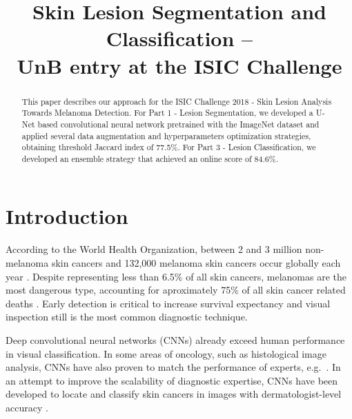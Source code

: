 \documentclass[conference]{IEEEtran}
\begin{document}
\title{Skin Lesion Segmentation and Classification --\\
  UnB entry at the ISIC Challenge}

\author{
}

\maketitle


\begin{abstract}
  This paper describes our approach for the ISIC Challenge 2018 - Skin Lesion Analysis Towards Melanoma Detection. For Part 1 - Lesion Segmentation, we developed a U-Net based convolutional neural network pretrained with the ImageNet dataset and applied several data augmentation and hyperparameters optimization strategies, obtaining threshold Jaccard index of 77.5\%. For Part 3 - Lesion Classification, we developed an ensemble strategy that achieved an online score of 84.6\%. 
\end{abstract}

\section{Introduction}

According to the World Health Organization, between 2 and 3 million non-melanoma skin cancers and 132,000 melanoma skin cancers occur globally each year \cite{who}. Despite representing less than 6.5\% of all skin cancers, melanomas are the most dangerous type, accounting for aproximately 75\% of all skin cancer related deaths \cite{who,nature}.
Early detection is critical to increase survival expectancy and visual inspection still is the most common diagnostic technique.

Deep convolutional neural networks (CNNs) already exceed human performance in visual classification\cite{fei}.
In some areas of oncology, such as histological image analysis, CNNs have also proven to match the performance of experts, e.g.\ \cite{veta_etal_mia2015}.
In an attempt to improve the scalability of diagnostic expertise, CNNs have been developed to locate and classify skin cancers in images with dermatologist-level accuracy \cite{nature}.
\end{document}
